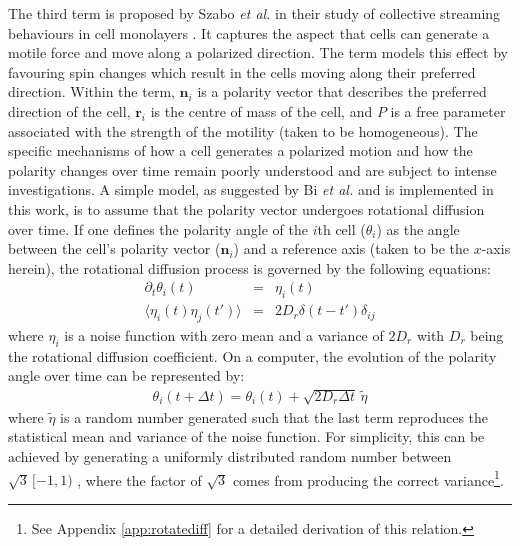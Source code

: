 \documentclass[a4paper,12pt]{article}
\begin{document}
The third term is proposed by Szabo \emph{et al.} in their study of collective streaming behaviours in cell monolayers \cite{szabo2010}. It captures the aspect that  cells can generate a motile force and move along a polarized direction. The term models this effect by favouring spin changes which result in the cells moving along their preferred direction. Within the term, $\bm{n}_i$ is a polarity vector that describes the preferred direction of the cell, $\bm{r}_i$ is the centre of mass of the cell, and $P$ is a free parameter associated with the strength of the motility (taken to be homogeneous). The specific mechanisms of how a cell generates a polarized motion and how the polarity changes over time remain poorly understood and are subject to intense investigations\cite{ridley2003,mori2008}. A simple model, as suggested by Bi \emph{et al.} \cite{bi2015motility} and is implemented in this work, is to assume that the polarity vector undergoes rotational diffusion over time. If one defines the polarity angle of the $i$th cell ($\theta_i$) as the angle between the cell's polarity vector ($\bm{n}_i$) and a reference axis (taken to be the $x$-axis herein), the rotational diffusion process is governed by the following equations:
\begin{eqnarray}
\partial_t\theta_i(t) & = & \eta_i(t)\\
\langle{\eta_i(t)\eta_j(t')\rangle} & = & 2D_r\delta(t-t')\delta_{ij}
\end{eqnarray}
where $\eta_i$ is a noise function with zero mean and a variance of $2D_r$ with $D_r$ being the rotational diffusion coefficient. On a computer, the evolution of the polarity angle over time can be represented by:
\begin{eqnarray}
\label{eqn:computerRotateDiff}
\theta_i(t+\Delta t) = \theta_i(t) + \sqrt{2D_r\Delta t}\,\tilde\eta
\end{eqnarray}
where $\tilde\eta$ is a random number generated such that the last term reproduces the statistical mean and variance of the noise function. For simplicity, this can be achieved by generating a uniformly distributed random number between $\sqrt{3}\,[-1,1)$ , where the factor of $\sqrt{3}$ comes from producing the correct variance\footnote{See Appendix \ref{app:rotatediff} for a detailed derivation of this relation.}.
\end{document}
